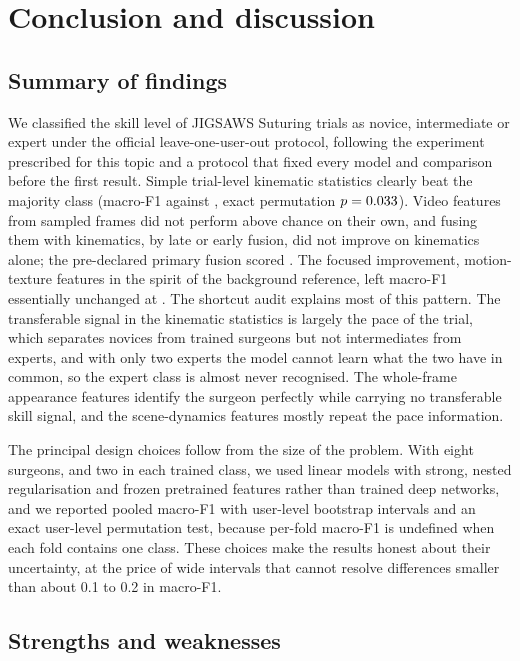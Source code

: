 \section{Conclusion and discussion}

\subsection{Summary of findings}

We classified the skill level of JIGSAWS Suturing trials as novice, intermediate or expert under the official leave-one-user-out protocol, following the experiment prescribed for this topic and a protocol that fixed every model and comparison before the first result. Simple trial-level kinematic statistics clearly beat the majority class (macro-F1 \FMOne{} against \FMZero{}, exact permutation $p = 0.033{}$). Video features from sampled frames did not perform above chance on their own, and fusing them with kinematics, by late or early fusion, did not improve on kinematics alone; the pre-declared primary fusion scored \FMThree{}. The focused improvement, motion-texture features in the spirit of the background reference, left macro-F1 essentially unchanged at \FMFour{}. The shortcut audit explains most of this pattern. The transferable signal in the kinematic statistics is largely the pace of the trial, which separates novices from trained surgeons but not intermediates from experts, and with only two experts the model cannot learn what the two have in common, so the expert class is almost never recognised. The whole-frame appearance features identify the surgeon perfectly while carrying no transferable skill signal, and the scene-dynamics features mostly repeat the pace information.

The principal design choices follow from the size of the problem. With eight surgeons, and two in each trained class, we used linear models with strong, nested regularisation and frozen pretrained features rather than trained deep networks, and we reported pooled macro-F1 with user-level bootstrap intervals and an exact user-level permutation test, because per-fold macro-F1 is undefined when each fold contains one class. These choices make the results honest about their uncertainty, at the price of wide intervals that cannot resolve differences smaller than about 0.1 to 0.2 in macro-F1.

\subsection{Strengths and weaknesses}

